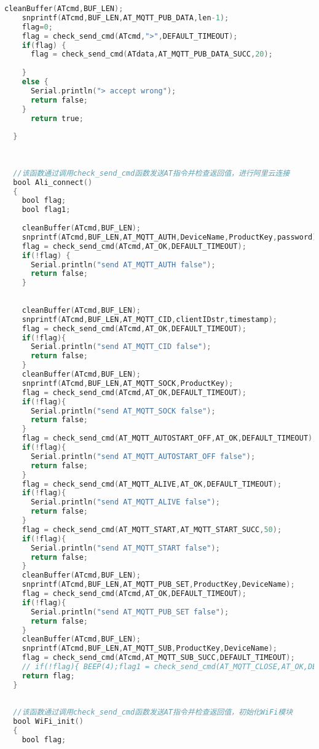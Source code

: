 \documentclass[12pt,hyperref,a4paper,UTF8]{ctexart}
\begin{document}
\begin{lstlisting}[language=C]
    cleanBuffer(ATcmd,BUF_LEN);
    snprintf(ATcmd,BUF_LEN,AT_MQTT_PUB_DATA,len-1);
    flag=0;
    flag = check_send_cmd(ATcmd,">",DEFAULT_TIMEOUT);
    if(flag) {
      flag = check_send_cmd(ATdata,AT_MQTT_PUB_DATA_SUCC,20);
      
    } 
    else {
      Serial.println("> accept wrong");
      return false;
    }
      return true;
  
  }
  
  
  
  //该函数通过调用check_send_cmd函数发送AT指令并检查返回值，进行阿里云连接
  bool Ali_connect()
  {
    bool flag;
    bool flag1;
  
    cleanBuffer(ATcmd,BUF_LEN);
    snprintf(ATcmd,BUF_LEN,AT_MQTT_AUTH,DeviceName,ProductKey,password);
    flag = check_send_cmd(ATcmd,AT_OK,DEFAULT_TIMEOUT);
    if(!flag) {
      Serial.println("send AT_MQTT_AUTH false");
      return false;
    }
  
  
    cleanBuffer(ATcmd,BUF_LEN);
    snprintf(ATcmd,BUF_LEN,AT_MQTT_CID,clientIDstr,timestamp);
    flag = check_send_cmd(ATcmd,AT_OK,DEFAULT_TIMEOUT);
    if(!flag){
      Serial.println("send AT_MQTT_CID false");
      return false;
    }
    cleanBuffer(ATcmd,BUF_LEN);
    snprintf(ATcmd,BUF_LEN,AT_MQTT_SOCK,ProductKey);
    flag = check_send_cmd(ATcmd,AT_OK,DEFAULT_TIMEOUT);
    if(!flag){
      Serial.println("send AT_MQTT_SOCK false");
      return false;
    }
    flag = check_send_cmd(AT_MQTT_AUTOSTART_OFF,AT_OK,DEFAULT_TIMEOUT);
    if(!flag){
      Serial.println("send AT_MQTT_AUTOSTART_OFF false");
      return false;
    }
    flag = check_send_cmd(AT_MQTT_ALIVE,AT_OK,DEFAULT_TIMEOUT);
    if(!flag){
      Serial.println("send AT_MQTT_ALIVE false");
      return false;
    }
    flag = check_send_cmd(AT_MQTT_START,AT_MQTT_START_SUCC,50);
    if(!flag){
      Serial.println("send AT_MQTT_START false");
      return false;
    }
    cleanBuffer(ATcmd,BUF_LEN);
    snprintf(ATcmd,BUF_LEN,AT_MQTT_PUB_SET,ProductKey,DeviceName);
    flag = check_send_cmd(ATcmd,AT_OK,DEFAULT_TIMEOUT);
    if(!flag){
      Serial.println("send AT_MQTT_PUB_SET false");
      return false;
    }
    cleanBuffer(ATcmd,BUF_LEN);
    snprintf(ATcmd,BUF_LEN,AT_MQTT_SUB,ProductKey,DeviceName);
    flag = check_send_cmd(ATcmd,AT_MQTT_SUB_SUCC,DEFAULT_TIMEOUT);
    // if(!flag){ BEEP(4);flag1 = check_send_cmd(AT_MQTT_CLOSE,AT_OK,DEFAULT_TIMEOUT);}
    return flag;
  }
  
  
  //该函数通过调用check_send_cmd函数发送AT指令并检查返回值，初始化WiFi模块
  bool WiFi_init()
  {
    bool flag;
  

\end{lstlisting}
\end{document}
